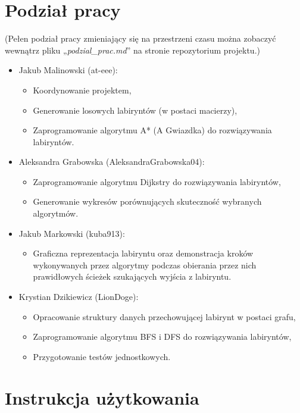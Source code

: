 \documentclass{article}
\begin{document}
\section{Podział pracy}

(Pełen podział pracy zmieniający się na przestrzeni czasu można zobaczyć wewnątrz pliku „\textit{podzial\_prac.md}” na stronie repozytorium projektu.)

\begin{itemize}
    \item Jakub Malinowski (at-eee):
    \begin{itemize}
        \item Koordynowanie projektem,
        \item Generowanie losowych labiryntów (w postaci macierzy),
        \item Zaprogramowanie algorytmu A* (A Gwiazdka) do rozwiązywania labiryntów.
    \end{itemize}
    \item Aleksandra Grabowska (AleksandraGrabowska04):
    \begin{itemize}
        \item Zaprogramowanie algorytmu Dijkstry do rozwiązywania labiryntów,
        \item Generowanie wykresów porównujących skuteczność wybranych algorytmów.
    \end{itemize}
    \item Jakub Markowski (kuba913):
    \begin{itemize}
        \item Graficzna reprezentacja labiryntu oraz demonstracja kroków wykonywanych przez algorytmy podczas obierania przez nich prawidłowych ścieżek szukających wyjścia z labiryntu.
    \end{itemize}
    \item Krystian Dzikiewicz (LionDoge):
    \begin{itemize}
        \item Opracowanie struktury danych przechowującej labirynt w postaci grafu,
        \item Zaprogramowanie algorytmu BFS i DFS do rozwiązywania labiryntów,
        \item Przygotowanie testów jednostkowych.
    \end{itemize}
\end{itemize}

\section{Instrukcja użytkowania}
\end{document}
